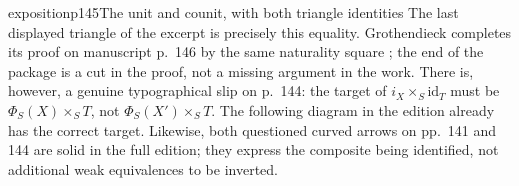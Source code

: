 \begin{dcomment}{exposition}{p145}{The unit and counit, with both triangle identities}
The last displayed triangle of the excerpt is precisely this equality. Grothendieck completes its proof on manuscript p.~146 by the same naturality square \citep[VI, ms.~pp.~146--147]{Grothendieck1990VI}; the end of the package is a cut in the proof, not a missing argument in the work. There is, however, a genuine typographical slip on p.~144: the target of $i_X\times_S\mathrm{id}_T$ must be $\Phi_S(X)\times_ST$, not $\Phi_S(X')\times_ST$. The following diagram in the edition already has the correct target. Likewise, both questioned curved arrows on pp.~141 and 144 are solid in the full edition; they express the composite being identified, not additional weak equivalences to be inverted.
\end{dcomment}

